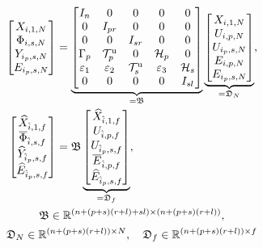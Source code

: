 \begin{alignat}{2}
    \begin{bmatrix}
        X_{i,1,N}\\
        \Phi_{i,s,N}\\
        Y_{i_p,s,N}\\
        E_{i_p,s,N}
    \end{bmatrix}&=
    \underbrace{\begin{bmatrix}
        I_n      & 0      & 0       & 0 & 0\\
        0        & I_{pr} & 0       & 0 & 0\\
        0        & 0      & I_{sr}  & 0 & 0\\
        \Gamma_p & \mathcal{T}_p^\mathrm{u} & 0 & \mathcal{H}_p & 0\\
        \varepsilon_1 & \varepsilon_2 & \mathcal{T}_s^\mathrm{u} & \varepsilon_3 & \mathcal{H}_s\\
        0 & 0 & 0 & 0 & I_{sl}
    \end{bmatrix}}_{=\mathfrak{B}}
    \underbrace{\begin{bmatrix}
        X_{i,1,N}\\
        U_{i,p,N}\\
        U_{i_p,s,N}\\
        E_{i,p,N}\\
        E_{i_p,s,N}
    \end{bmatrix}}_{=\mathfrak{D}_N},\notag\\%
    \begin{bmatrix}
        \widehat{X}_{\hat{i},1,f}\\
        \overline{\Phi}_{\hat{i},s,f}\\
        \widehat{Y}_{\hat{i}_p,s,f}\\
        \widehat{E}_{\hat{i}_p,s,f}
    \end{bmatrix}&=
    \mathfrak{B}
    \underbrace{\begin{bmatrix}
        \widehat{X}_{\hat{i},1,f}\\
        U_{\hat{i},p,f}\\
        U_{\hat{i}_p,s,f}\\
        \overline{E}_{\hat{i},p,f}\\
        \widehat{E}_{\hat{i}_p,s,f}
    \end{bmatrix}}_{=\mathfrak{D}_f},\label{eq:BD_f}\\%
    \span\mathfrak{B}\in\mathbb{R}^{(n+(p+s)(r+l)+sl)\times (n+(p+s)(r+l))},\notag\\
    \span\mathfrak{D}_N\in\mathbb{R}^{(n+(p+s)(r+l))\times N},\quad \mathfrak{D}_f\in\mathbb{R}^{(n+(p+s)(r+l))\times f}\notag
\end{alignat}
